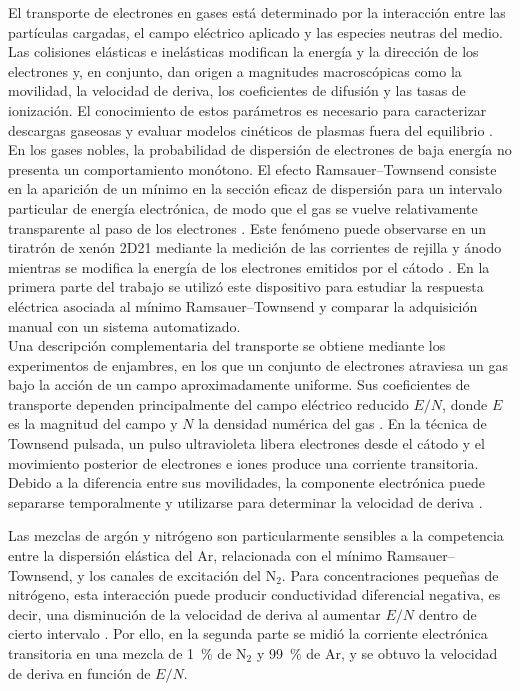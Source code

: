 \label{sec:introduccion}

El transporte de electrones en gases está determinado por la interacción entre las partículas cargadas, el campo eléctrico aplicado y las especies neutras del medio. Las colisiones elásticas e inelásticas modifican la energía y la dirección de los electrones y, en conjunto, dan origen a magnitudes macroscópicas como la movilidad, la velocidad de deriva, los coeficientes de difusión y las tasas de ionización. El conocimiento de estos parámetros es necesario para caracterizar descargas gaseosas y evaluar modelos cinéticos de plasmas fuera del equilibrio \cite{GonzalezMagana2024,Jovanovic2009}.\\

En los gases nobles, la probabilidad de dispersión de electrones de baja energía no presenta un comportamiento monótono. El efecto Ramsauer--Townsend consiste en la aparición de un mínimo en la sección eficaz de dispersión para un intervalo particular de energía electrónica, de modo que el gas se vuelve relativamente transparente al paso de los electrones \cite{Ramsauer1921}. Este fenómeno puede observarse en un tiratrón de xenón 2D21 mediante la medición de las corrientes de rejilla y ánodo mientras se modifica la energía de los electrones emitidos por el cátodo \cite{Kukolich1968}. En la primera parte del trabajo se utilizó este dispositivo para estudiar la respuesta eléctrica asociada al mínimo Ramsauer--Townsend y comparar la adquisición manual con un sistema automatizado.\\

Una descripción complementaria del transporte se obtiene mediante los experimentos de enjambres, en los que un conjunto de electrones atraviesa un gas bajo la acción de un campo aproximadamente uniforme. Sus coeficientes de transporte dependen principalmente del campo eléctrico reducido $E/N$, donde $E$ es la magnitud del campo y $N$ la densidad numérica del gas \cite{GonzalezMagana2019}. En la técnica de Townsend pulsada, un pulso ultravioleta libera electrones desde el cátodo y el movimiento posterior de electrones e iones produce una corriente transitoria. Debido a la diferencia entre sus movilidades, la componente electrónica puede separarse temporalmente y utilizarse para determinar la velocidad de deriva \cite{Jovanovic2009}.

Las mezclas de argón y nitrógeno son particularmente sensibles a la competencia entre la dispersión elástica del Ar, relacionada con el mínimo Ramsauer--Townsend, y los canales de excitación del $\mathrm{N_2}$. Para concentraciones pequeñas de nitrógeno, esta interacción puede producir conductividad diferencial negativa, es decir, una disminución de la velocidad de deriva al aumentar $E/N$ dentro de cierto intervalo \cite{Jovanovic2009}. Por ello, en la segunda parte se midió la corriente electrónica transitoria en una mezcla de \SI{1}{\percent} de $\mathrm{N_2}$ y \SI{99}{\percent} de Ar, y se obtuvo la velocidad de deriva en función de $E/N$.